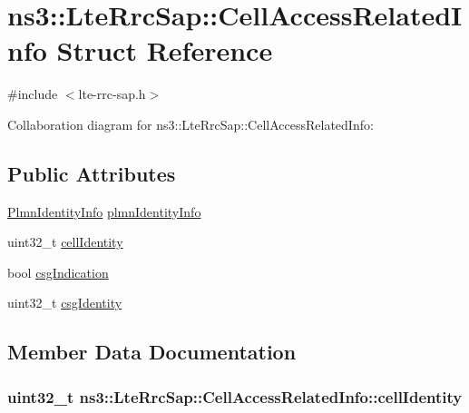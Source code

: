 \hypertarget{structns3_1_1LteRrcSap_1_1CellAccessRelatedInfo}{}\section{ns3\+:\+:Lte\+Rrc\+Sap\+:\+:Cell\+Access\+Related\+Info Struct Reference}
\label{structns3_1_1LteRrcSap_1_1CellAccessRelatedInfo}


{\ttfamily \#include $<$lte-\/rrc-\/sap.\+h$>$}



Collaboration diagram for ns3\+:\+:Lte\+Rrc\+Sap\+:\+:Cell\+Access\+Related\+Info\+:
\subsection*{Public Attributes}
\begin{DoxyCompactItemize}
\item 
\hyperlink{structns3_1_1LteRrcSap_1_1PlmnIdentityInfo}{Plmn\+Identity\+Info} \hyperlink{structns3_1_1LteRrcSap_1_1CellAccessRelatedInfo_a2937810a260c901559ed9568318dd304}{plmn\+Identity\+Info}
\item 
uint32\+\_\+t \hyperlink{structns3_1_1LteRrcSap_1_1CellAccessRelatedInfo_a233b52bc592cfdddb1570c211a4f2126}{cell\+Identity}
\item 
bool \hyperlink{structns3_1_1LteRrcSap_1_1CellAccessRelatedInfo_a4b7921d66079895fd8b375d4136715b9}{csg\+Indication}
\item 
uint32\+\_\+t \hyperlink{structns3_1_1LteRrcSap_1_1CellAccessRelatedInfo_a174f8b5b86633175296b54b9b38fbc95}{csg\+Identity}
\end{DoxyCompactItemize}


\subsection{Member Data Documentation}
\subsubsection[{\texorpdfstring{cell\+Identity}{cellIdentity}}]{\setlength{\rightskip}{0pt plus 5cm}uint32\+\_\+t ns3\+::\+Lte\+Rrc\+Sap\+::\+Cell\+Access\+Related\+Info\+::cell\+Identity}\hypertarget{structns3_1_1LteRrcSap_1_1CellAccessRelatedInfo_a233b52bc592cfdddb1570c211a4f2126}{}\label{structns3_1_1LteRrcSap_1_1CellAccessRelatedInfo_a233b52bc592cfdddb1570c211a4f2126}
